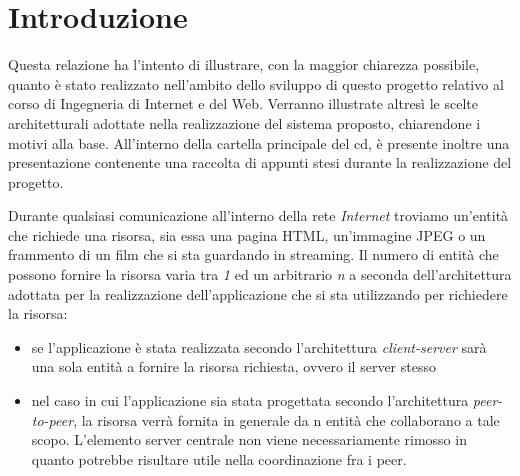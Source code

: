 \documentclass[paper=a4, oneside, fontsize=14pt, titlepage]{article}
\begin{document}
	\section{Introduzione}
		\begin{flushleft}
			Questa relazione ha l'intento di illustrare, con la maggior chiarezza possibile, quanto è stato realizzato nell'ambito dello sviluppo di questo progetto relativo al corso di Ingegneria di Internet e del Web. Verranno illustrate altresì le scelte architetturali adottate nella realizzazione del sistema proposto, chiarendone i motivi alla base. All'interno della cartella principale del cd, è presente inoltre una presentazione contenente una raccolta di appunti stesi durante la realizzazione del progetto.
		\end{flushleft}
		\begin{center}
			\hspace{1cm}
		\end{center}
		\begin{flushleft}
			Durante qualsiasi comunicazione all'interno della rete \textit{Internet} troviamo un'entità che richiede una risorsa, sia essa una pagina HTML, un'immagine JPEG o un frammento di un film che si sta guardando in streaming. Il numero di entità che possono fornire la risorsa varia tra \textit{1} ed un arbitrario \textit{n} a seconda dell'architettura adottata per la realizzazione dell'applicazione che si sta utilizzando per richiedere la risorsa:
		\end{flushleft}
		\begin{itemize}
			\item se l'applicazione è stata realizzata secondo l'architettura \textit{client-server} sarà una sola entità a fornire la risorsa richiesta, ovvero il server stesso
			\item nel caso in cui l'applicazione sia stata progettata secondo l'architettura \textit{peer-to-peer}, la risorsa verrà fornita in generale da n entità che collaborano a tale scopo. L'elemento server centrale non viene necessariamente rimosso in quanto potrebbe risultare utile nella coordinazione fra i peer.
		\end{itemize}
		\vspace{5mm}
\end{document}
